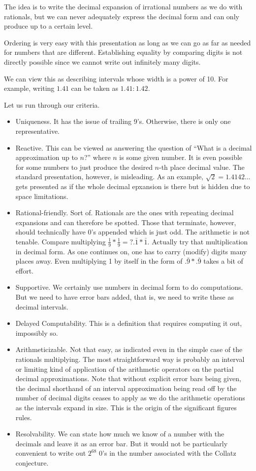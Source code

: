\documentclass[12pt]{article}
\theoremstyle{remark}
\begin{document}
The idea is to write the decimal expansion of irrational numbers as we do with rationals, but we can never adequately express the decimal form and can only produce up to a certain level. 

Ordering is very easy with this presentation as long as we can go as far as needed for numbers that are different. Establishing equality by comparing digits is not directly possible since we cannot write out infinitely many digits. 

We can view this as describing intervals whose width is a power of 10. For example, writing $1.41$ can be taken as $1.41:1.42$. 

Let us run through our criteria. 

\begin{itemize}
    \item Uniqueness. It has the issue of trailing 9's. Otherwise, there is only one representative. 
    \item Reactive. This can be viewed as answering the question of ``What is a decimal approximation up to $n$?'' where $n$ is some given number. It is even possible for some numbers to just produce the desired $n$-th place decimal value. The standard presentation, however, is misleading. As an example, $\sqrt{2} = 1.4142...$ gets presented as if the whole decimal epxansion is there but is hidden due to space limitations. 
    \item Rational-friendly. Sort of. Rationals are the ones with repeating decimal expansions and can therefore be spotted. Those that terminate, however, should technically have 0's appended which is just odd. The arithmetic is not tenable. Compare multiplying $\tfrac{1}{9}*\tfrac{1}{9} =? .\bar{1} * \bar{1}$. Actually try that multiplication in decimal form. As one continues on, one has to carry (modify) digits many places away. Even multiplying 1 by itself in the form of $.\bar{9}*.\bar{9}$ takes a bit of effort. 
    \item Supportive. We certainly use numbers in decimal form to do computations. But we need to have error bars added, that is, we need to write these as decimal intervals. 
    \item Delayed Computability. This is a definition that requires computing it out, impossibly so. 
    \item Arithmeticizable. Not that easy, as indicated even in the simple case of the rationals multiplying. The most straightforward way is probably an interval or limiting kind of application of the arithmetic operators on the partial decimal approximations. Note that without explicit error bars being given, the decimal shorthand of an interval approximation being read off by the number of decimal digits ceases to apply as we do the arithmetic operations as the intervals expand in size. This is the origin of the significant figures rules. 
    \item Resolvability. We can state how much we know of a number with the decimals and leave it as an error bar. But it would not be particularly convenient to write out $2^{68}$ 0's in the number associated with the Collatz conjecture. 
\end{itemize}
\end{document}
